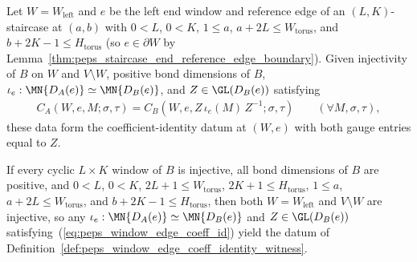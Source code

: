 \begin{definition}
    \label{def:peps_window_edge_coeff_identity_witness}
    \leanok
    Let $W=W_{\mathrm{left}}$ and $e$ be the left end window and reference edge
    of an $(L,K)$-staircase at $(a,b)$ with $0<L$, $0<K$, $1\le a$,
    $a+2L\le W_{\mathrm{torus}}$, and $b+2K-1\le H_{\mathrm{torus}}$ (so
    $e\in\partial W$ by Lemma~\ref{thm:peps_staircase_end_reference_edge_boundary}).
    Given injectivity of $B$ on $W$ and $V\setminus W$, positive bond
    dimensions of $B$, $\iota_e:\MN{D_A(e)}\simeq\MN{D_B(e)}$, and
    $Z\in\GL(D_B(e))$ satisfying
    \begin{align}
        C_A(W,e,M;\sigma,\tau)
        =
        C_B(W,e,Z\,\iota_e(M)\,Z^{-1};\sigma,\tau)
        \qquad(\forall M,\sigma,\tau),
        \label{eq:peps_window_edge_coeff_id}
    \end{align}
    these data form the coefficient-identity datum at $(W,e)$ with both gauge
    entries equal to $Z$.
\end{definition}

\begin{definition}
    \label{def:peps_window_edge_coeff_identity_witness_of_hypotheses}
    \leanok
    If every cyclic $L\times K$ window of $B$ is injective, all bond
    dimensions of $B$ are positive, and
    $0<L$, $0<K$, $2L+1\le W_{\mathrm{torus}}$, $2K+1\le H_{\mathrm{torus}}$,
    $1\le a$, $a+2L\le W_{\mathrm{torus}}$, and $b+2K-1\le H_{\mathrm{torus}}$,
    then both $W=W_{\mathrm{left}}$ and $V\setminus W$ are injective, so any
    $\iota_e:\MN{D_A(e)}\simeq\MN{D_B(e)}$ and $Z\in\GL(D_B(e))$
    satisfying~(\ref{eq:peps_window_edge_coeff_id}) yield the datum of
    Definition~\ref{def:peps_window_edge_coeff_identity_witness}.
\end{definition}



